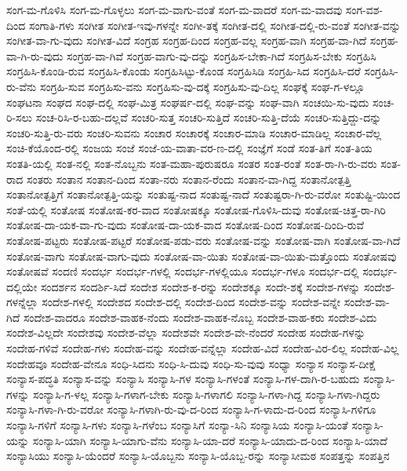 {ಸಂಗ-ಮ-ಗೊಳಿಸಿ
ಸಂಗ-ಮ-ಗೊಳ್ಳಲು
ಸಂಗ-ಮ-ವಾಗು-ವಂತೆ
ಸಂಗ-ಮ-ವಾದರೆ
ಸಂಗ-ಮ-ವಾದವು
ಸಂಗ-ವಶ-ದಿಂದ
ಸಂಗಾತಿ-ಗಳು
ಸಂಗೀತ
ಸಂಗೀತ-ಇವು-ಗಳನ್ನೇ
ಸಂಗೀ-ತಕ್ಕೆ
ಸಂಗೀತ-ದಲ್ಲಿ
ಸಂಗೀತ-ದಲ್ಲಿ-ರು-ವಂತೆ
ಸಂಗೀತ-ವನ್ನು
ಸಂಗೀತ-ವಾ-ಗು-ವುದು
ಸಂಗೀತ-ವಿದೆ
ಸಂಗ್ರಹ
ಸಂಗ್ರಹ-ದಿಂದ
ಸಂಗ್ರಹ-ವಲ್ಲ
ಸಂಗ್ರಹ-ವಾಗಿ
ಸಂಗ್ರಹ-ವಾ-ಗಿದೆ
ಸಂಗ್ರಹ-ವಾ-ಗಿ-ರು-ವುದು
ಸಂಗ್ರಹ-ವಾ-ಗಿವೆ
ಸಂಗ್ರಹ-ವಾಗು-ವು-ದನ್ನು
ಸಂಗ್ರಹಿಸ-ಬೇಕಾ-ಗಿದೆ
ಸಂಗ್ರಹಿಸ-ಬೇಕು
ಸಂಗ್ರಹಿಸಿ
ಸಂಗ್ರಹಿಸಿ-ಕೊಂಡಿ-ರುವ
ಸಂಗ್ರಹಿಸಿ-ಕೊಂಡು
ಸಂಗ್ರಹಿಸಿಟ್ಟು-ಕೊಂಡ
ಸಂಗ್ರಹಿಸಿಡಿ
ಸಂಗ್ರಹಿ-ಸಿದ
ಸಂಗ್ರಹಿಸಿ-ದರೆ
ಸಂಗ್ರಹಿಸಿ-ರು-ವೆನು
ಸಂಗ್ರಹಿ-ಸುವ
ಸಂಗ್ರಹಿಸು-ವನು
ಸಂಗ್ರಹಿಸು-ವು-ದಕ್ಕೆ
ಸಂಗ್ರಹಿಸು-ವು-ದಿಲ್ಲ
ಸಂಘಕ್ಕೆ
ಸಂಘ-ಗ-ಳಲ್ಲೂ
ಸಂಘಟನಾ
ಸಂಘದ
ಸಂಘ-ದಲ್ಲಿ
ಸಂಘ-ಮಿತ್ರ
ಸಂಘರ್ಷ-ದಲ್ಲಿ
ಸಂಘ-ವನ್ನು
ಸಂಘ-ವಾಗಿ
ಸಂಚಯಿ-ಸು-ವುದು
ಸಂಚ-ರಿ-ಸಲು
ಸಂಚ-ರಿಸಿ-ರ-ಬಹು-ದಲ್ಲವೆ
ಸಂಚರಿ-ಸುತ್ತ
ಸಂಚರಿ-ಸುತ್ತಿದೆ
ಸಂಚರಿ-ಸುತ್ತಿ-ದೆಯೆ
ಸಂಚರಿ-ಸುತ್ತಿದ್ದು-ದನ್ನು
ಸಂಚರಿ-ಸುತ್ತಿ-ರು-ವರು
ಸಂಚರಿ-ಸುವನು
ಸಂಚಾರ
ಸಂಚಾರಕ್ಕೆ
ಸಂಚಾರ-ಮಾಡಿ
ಸಂಚಾರ-ಮಾಡಿಲ್ಲ
ಸಂಚಾರ-ವೆಲ್ಲ
ಸಂಚಿ-ಕೆಯೊಂದ-ರಲ್ಲಿ
ಸಂಜಯ
ಸಂಜೆ
ಸಂಜೆ-ಯ-ವಾತಾ-ವರ-ಣ-ದಲ್ಲಿ
ಸಂಜ್ಞೆಗೆ
ಸಂಡೆ
ಸಂತ-ತಿಗೆ
ಸಂತ-ತಿಯ
ಸಂತತಿ-ಯಲ್ಲಿ
ಸಂತ-ನಲ್ಲಿ
ಸಂತ-ನೊಬ್ಬನು
ಸಂತ-ಮಹಾ-ಪುರುಷರೂ
ಸಂತರ
ಸಂತ-ರಂತೆ
ಸಂತ-ರಾ-ಗಿ-ರು-ವರು
ಸಂತ-ರಾದ
ಸಂತರು
ಸಂತಾನ
ಸಂತಾನ-ದಿಂದ
ಸಂತಾ-ನರು
ಸಂತಾನ-ರೆಂದು
ಸಂತಾನ-ವಾ-ಗಿದ್ದ
ಸಂತಾನೋತ್ಪತ್ತಿ
ಸಂತಾನೋತ್ಪತ್ತಿಗೆ
ಸಂತಾನೋತ್ಪತ್ತಿ-ಯನ್ನು
ಸಂತುಷ್ಟ-ನಾದ
ಸಂತುಷ್ಟ-ನಾದೆ
ಸಂತುಷ್ಟರಾ-ಗಿ-ರು-ವರೋ
ಸಂತುಷ್ಟಿ-ಯಿಂದ
ಸಂತೆ-ಯಲ್ಲಿ
ಸಂತೋಷ
ಸಂತೋಷ-ಕರ-ವಾದ
ಸಂತೋಷಕ್ಕೂ
ಸಂತೋಷ-ಗೊಳಿಸಿ-ದುವು
ಸಂತೋಷ-ಚಿತ್ತ-ರಾ-ಗಿರಿ
ಸಂತೋಷ-ದಾ-ಯಕ-ವಾ-ಗು-ವುದು
ಸಂತೋಷ-ದಾ-ಯಕ-ವಾದ
ಸಂತೋಷ-ದಿಂದ
ಸಂತೋಷ-ದಿಂದಿ-ರುವೆ
ಸಂತೋಷ-ಪಟ್ಟರು
ಸಂತೋಷ-ಪಟ್ಟರೆ
ಸಂತೋಷ-ಪಡು-ವರು
ಸಂತೋಷ-ವನ್ನು
ಸಂತೋಷ-ವಾಗಿ
ಸಂತೋಷ-ವಾ-ಗಿದೆ
ಸಂತೋಷ-ವಾಗು
ಸಂತೋಷ-ವಾಗು-ವುದು
ಸಂತೋಷ-ವಾ-ಯಿತು
ಸಂತೋಷ-ವಾ-ಯಿತು-ಮತ್ತೊಂದು
ಸಂತೋಷವು
ಸಂತೋಷವೆ
ಸಂದಣಿ
ಸಂದರ್ಭ
ಸಂದರ್ಭ-ಗಳಲ್ಲಿ
ಸಂದರ್ಭ-ಗಳಲ್ಲಿಯೂ
ಸಂದರ್ಭ-ಗಳೂ
ಸಂದರ್ಭ-ದಲ್ಲಿ
ಸಂದರ್ಭ-ದಲ್ಲಿಯೇ
ಸಂದರ್ಶನ
ಸಂದರ್ಶಿ-ಸಿದೆ
ಸಂದೇಶ
ಸಂದೇಶ-ಕ-ರನ್ನು
ಸಂದೇಶಕ್ಕೂ
ಸಂದೇ-ಶಕ್ಕೆ
ಸಂದೇಶ-ಗಳನ್ನು
ಸಂದೇಶ-ಗಳನ್ನೆಲ್ಲಾ
ಸಂದೇಶ-ಗಳಲ್ಲಿ
ಸಂದೇಶದ
ಸಂದೇಶ-ದಲ್ಲಿ
ಸಂದೇಶ-ದಿಂದ
ಸಂದೇಶ-ವನ್ನು
ಸಂದೇಶ-ವನ್ನೇ
ಸಂದೇಶ-ವಾ-ಗಿದೆ
ಸಂದೇಶ-ವಾದರೂ
ಸಂದೇಶ-ವಾಹಕ-ನೆಂದು
ಸಂದೇಶ-ವಾಹಕ-ನೊಬ್ಬ
ಸಂದೇಶ-ವಾಹ-ಕರು
ಸಂದೇಶ-ವಿದು
ಸಂದೇಶ-ವಿಲ್ಲದೇ
ಸಂದೇಶವು
ಸಂದೇಶ-ವೆಲ್ಲಾ
ಸಂದೇಶವೇ
ಸಂದೇಶ-ವೇ-ನೆಂದರೆ
ಸಂದೇಹ
ಸಂದೇಹ-ಗಳನ್ನು
ಸಂದೇಹ-ಗಳಿವೆ
ಸಂದೇಹ-ಗಳು
ಸಂದೇಹ-ವನ್ನು
ಸಂದೇಹ-ವನ್ನೆಲ್ಲಾ
ಸಂದೇಹ-ವಿದೆ
ಸಂದೇಹ-ವಿರ-ಲಿಲ್ಲ
ಸಂದೇಹ-ವಿಲ್ಲ
ಸಂದೇಹವೂ
ಸಂದೇಹ-ವೇನೂ
ಸಂಧಿ-ಸಿದನು
ಸಂಧಿ-ಸಿ-ದುವು
ಸಂಧಿ-ಸು-ವುವು
ಸಂಧ್ಯಾ
ಸಂನ್ಯಾಸ
ಸಂನ್ಯಾಸ-ದೀಕ್ಷೆ
ಸಂನ್ಯಾಸ-ಪದ್ಧತಿ
ಸಂನ್ಯಾಸ-ವನ್ನು
ಸಂನ್ಯಾಸಿ
ಸಂನ್ಯಾಸಿ-ಗಳ
ಸಂನ್ಯಾಸಿ-ಗಳಂತೆ
ಸಂನ್ಯಾಸಿ-ಗಳ-ದಾಗಿ-ರ-ಬಹುದು
ಸಂನ್ಯಾಸಿ-ಗಳನ್ನು
ಸಂನ್ಯಾಸಿ-ಗ-ಳಲ್ಲ
ಸಂನ್ಯಾಸಿ-ಗಳಾಗ-ಬೇಕು
ಸಂನ್ಯಾಸಿ-ಗಳಾಗಲಿ
ಸಂನ್ಯಾಸಿ-ಗಳಾ-ಗಿದ್ದ
ಸಂನ್ಯಾಸಿ-ಗಳಾ-ಗಿದ್ದರು
ಸಂನ್ಯಾಸಿ-ಗಳಾ-ಗಿ-ರು-ವರೋ
ಸಂನ್ಯಾಸಿ-ಗಳಾಗಿ-ರು-ವು-ದ-ರಿಂದ
ಸಂನ್ಯಾಸಿ-ಗ-ಳಾದು-ದ-ರಿಂದ
ಸಂನ್ಯಾಸಿ-ಗಳಿಗೂ
ಸಂನ್ಯಾಸಿ-ಗಳಿಗೆ
ಸಂನ್ಯಾಸಿ-ಗಳು
ಸಂನ್ಯಾಸಿ-ಗಳೆಂಬ
ಸಂನ್ಯಾಸಿಗೆ
ಸಂನ್ಯಾ-ಸಿನಿ
ಸಂನ್ಯಾಸಿಯ
ಸಂನ್ಯಾಸಿ-ಯಂತೆ
ಸಂನ್ಯಾಸಿ-ಯನ್ನು
ಸಂನ್ಯಾಸಿ-ಯಾಗಿ
ಸಂನ್ಯಾಸಿ-ಯಾಗು-ವೆನು
ಸಂನ್ಯಾಸಿ-ಯಾ-ದರೆ
ಸಂನ್ಯಾಸಿ-ಯಾದು-ದ-ರಿಂದ
ಸಂನ್ಯಾಸಿ-ಯಾದೆ
ಸಂನ್ಯಾಸಿಯು
ಸಂನ್ಯಾಸಿ-ಯೆಂದರೆ
ಸಂನ್ಯಾಸಿ-ಯೊಬ್ಬನು
ಸಂನ್ಯಾಸಿ-ಯೊಬ್ಬ-ರನ್ನು
ಸಂನ್ಯಾಸೀಮಠ
ಸಂಪತ್ತನ್ನು
ಸಂಪತ್ತಿನ
}
